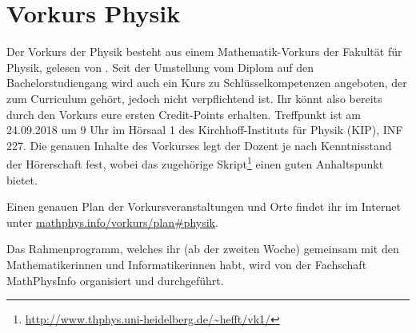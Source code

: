 \section{Vorkurs Physik}
Der Vorkurs der Physik besteht aus einem Mathematik-Vorkurs der Fakultät für Physik, gelesen von \dozentvorkurs. Seit der Umstellung vom Diplom auf den Bachelorstudiengang wird auch ein Kurs zu Schlüsselkompetenzen angeboten, der zum Curriculum gehört, jedoch nicht verpflichtend ist. Ihr könnt also bereits durch den Vorkurs eure ersten Credit-Points erhalten. Treffpunkt ist am 24.09.2018 um 9 Uhr im Hörsaal 1 des Kirchhoff-Instituts für Physik (KIP), \Gls{INF} 227. Die genauen Inhalte des Vorkurses legt der Dozent je nach Kenntnisstand der Hörerschaft fest, wobei das zugehörige Skript\footnote{\url{http://www.thphys.uni-heidelberg.de/~hefft/vk1/}} einen guten Anhaltspunkt bietet.

Einen genauen Plan der Vorkursveranstaltungen und Orte findet ihr im Internet unter \url{mathphys.info/vorkurs/plan\#physik}.

Das Rahmenprogramm, welches ihr (ab der zweiten Woche) gemeinsam mit den Mathematikerinnen und Informatikerinnen habt, wird von der Fachschaft MathPhysInfo organisiert und durchgeführt.

